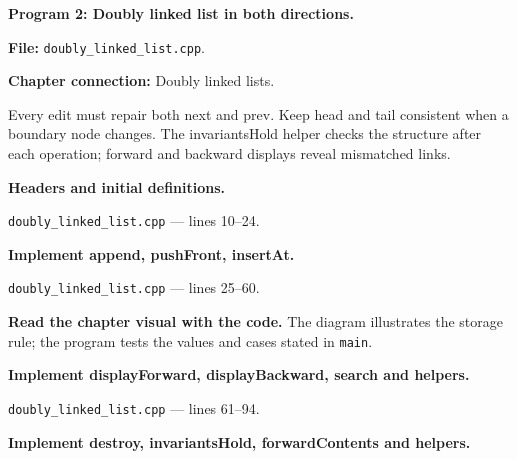 \textbf{Program 2: Doubly linked list in both directions.}

\textbf{File:} \texttt{doubly\_linked\_list.cpp}.

\textbf{Chapter connection:} Doubly linked lists.

Every edit must repair both next and prev. Keep head and tail consistent when a boundary node changes. The invariantsHold helper checks the structure after each operation; forward and backward displays reveal mismatched links.



\begin{utpsteps}\setcounter{enumi}{0}\item \textbf{Headers and initial definitions.}\end{utpsteps}

\texttt{doubly\_linked\_list.cpp} --- lines 10--24.




\tcbbreak

\begin{utpsteps}\setcounter{enumi}{1}\item \textbf{Implement append, pushFront, insertAt.}\end{utpsteps}

\texttt{doubly\_linked\_list.cpp} --- lines 25--60.

\textbf{Read the chapter visual with the code.} The diagram illustrates the storage rule; the program tests the values and cases stated in \texttt{main}.





\tcbbreak

\begin{utpsteps}\setcounter{enumi}{2}\item \textbf{Implement displayForward, displayBackward, search and helpers.}\end{utpsteps}

\texttt{doubly\_linked\_list.cpp} --- lines 61--94.






\tcbbreak

\begin{utpsteps}\setcounter{enumi}{3}\item \textbf{Implement destroy, invariantsHold, forwardContents and helpers.}\end{utpsteps}

